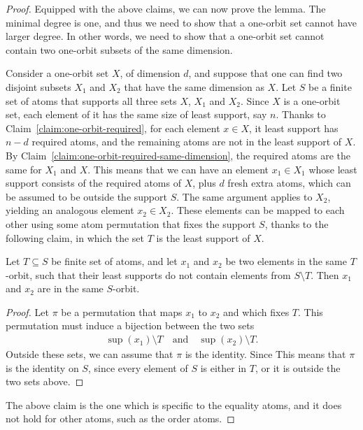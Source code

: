 \begin{proof}
Equipped with the above claims, we can now prove the lemma. The minimal degree is one, and thus we need to show that a one-orbit set cannot have larger degree. In other words, we need to show that a one-orbit set cannot contain two one-orbit  subsets of the same dimension.


Consider a one-orbit set $X$, of dimension $d$, and suppose that one can find two disjoint subsets $X_1$ and $X_2$ that have the same dimension as $X$. Let $S$ be a finite set of atoms that supports all three sets $X$, $X_1$ and $X_2$.  Since $X$ is a one-orbit set, each element of it has the same size of least support, say $n$. Thanks to Claim~\ref{claim:one-orbit-required}, for each element $x \in X$, it least support has $n-d$ required atoms, and the remaining atoms are not in the least support of $X$. By Claim~\ref{claim:one-orbit-required-same-dimension}, the required atoms are the same for $X_1$ and $X$. This means that we can have an element $x_1 \in X_1$ whose least support consists of the required atoms of $X$, plus $d$ fresh extra atoms, which can be assumed to be outside the support $S$. The same argument applies to $X_2$, yielding an analogous element $x_2 \in X_2$. These elements can be mapped to each other using some atom permutation that fixes the support $S$, thanks to the following claim, in which the set $T$ is the least support of $X$. 

\begin{claim}
    Let $T \subseteq S$ be finite set of atoms, and let $x_1$ and $x_2$ be two elements in the same $T$-orbit, such that their least supports do not contain elements from $S \setminus T$. Then $x_1$ and $x_2$ are in the same $S$-orbit. 
\end{claim}
\begin{proof}
    Let $\pi$ be a permutation that maps $x_1$ to $x_2$ and which fixes $T$. This permutation must induce a bijection between the two sets 
    \begin{align*}
    \sup(x_1) \setminus T 
    \quad \text{and} \quad
    \sup(x_2) \setminus T.
    \end{align*}
    Outside these sets, we can assume that $\pi$ is the identity. Since This means that $\pi$ is the identity on $S$, since every element of $S$ is either in $T$, or it is outside the two sets above. 
\end{proof}

The above claim is the one which is specific to the equality atoms, and it does not hold for other atoms, such as the order atoms.
\end{proof}


